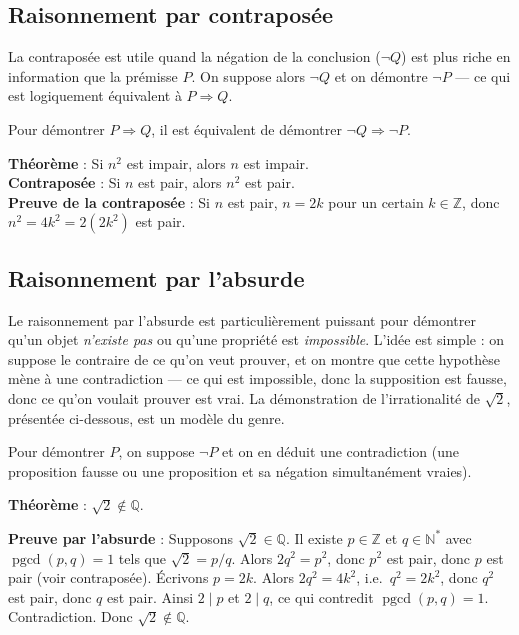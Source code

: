 \documentclass[11pt,a4paper,twoside]{book}
\newcommand{\N}{\mathbb{N}}
\newcommand{\Z}{\mathbb{Z}}
\newcommand{\Q}{\mathbb{Q}}
\DeclareMathOperator{\pgcd}{pgcd}
\begin{document}
\subsection{Raisonnement par contraposée}

La contraposée est utile quand la négation de la conclusion ($\neg Q$) est plus riche en information que la prémisse $P$. On suppose alors $\neg Q$ et on démontre $\neg P$ — ce qui est logiquement équivalent à $P \Rightarrow Q$.

\begin{propositionbox}
Pour démontrer $P \Rightarrow Q$, il est équivalent de démontrer $\neg Q \Rightarrow \neg P$.
\end{propositionbox}

\begin{exemplebox}[Contraposée]
\textbf{Théorème} : Si $n^2$ est impair, alors $n$ est impair.\\
\textbf{Contraposée} : Si $n$ est pair, alors $n^2$ est pair.\\
\textbf{Preuve de la contraposée} : Si $n$ est pair, $n = 2k$ pour un certain $k \in \Z$,
donc $n^2 = 4k^2 = 2(2k^2)$ est pair.
\end{exemplebox}

\subsection{Raisonnement par l'absurde}

Le raisonnement par l'absurde est particulièrement puissant pour démontrer qu'un objet \emph{n'existe pas} ou qu'une propriété est \emph{impossible}. L'idée est simple : on suppose le contraire de ce qu'on veut prouver, et on montre que cette hypothèse mène à une contradiction — ce qui est impossible, donc la supposition est fausse, donc ce qu'on voulait prouver est vrai. La démonstration de l'irrationalité de $\sqrt{2}$, présentée ci-dessous, est un modèle du genre.

\begin{methodebox}
Pour démontrer $P$, on suppose $\neg P$ et on en déduit une contradiction
(une proposition fausse ou une proposition et sa négation simultanément vraies).
\end{methodebox}

\begin{exemplebox}
\textbf{Théorème} : $\sqrt{2} \notin \Q$.

\textbf{Preuve par l'absurde} : Supposons $\sqrt{2} \in \Q$.
Il existe $p \in \Z$ et $q \in \N^*$ avec $\pgcd(p,q) = 1$ tels que $\sqrt{2} = p/q$.
Alors $2q^2 = p^2$, donc $p^2$ est pair, donc $p$ est pair (voir contraposée).
Écrivons $p = 2k$. Alors $2q^2 = 4k^2$, i.e.\ $q^2 = 2k^2$, donc $q^2$ est pair,
donc $q$ est pair. Ainsi $2 \mid p$ et $2 \mid q$, ce qui contredit $\pgcd(p,q)=1$.
Contradiction. Donc $\sqrt{2} \notin \Q$.
\end{exemplebox}
\end{document}
